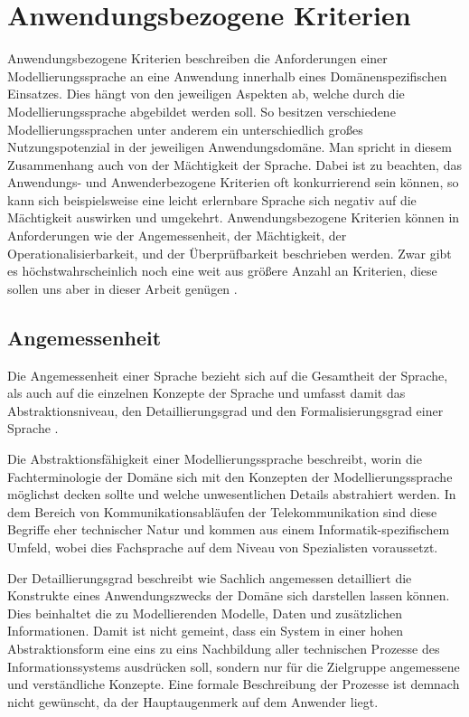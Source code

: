 \section{Anwendungsbezogene Kriterien}
\label{sc:AnwendungsbezogeneKriterien}
Anwendungsbezogene Kriterien beschreiben die Anforderungen einer Modellierungssprache an eine Anwendung innerhalb eines Domänenspezifischen Einsatzes.
Dies hängt von den jeweiligen Aspekten ab, welche durch die Modellierungssprache abgebildet werden soll.
So besitzen verschiedene Modellierungssprachen unter anderem ein unterschiedlich großes Nutzungspotenzial in der jeweiligen Anwendungsdomäne.
Man spricht in diesem Zusammenhang auch von der Mächtigkeit der Sprache.
Dabei ist zu beachten, das Anwendungs- und Anwenderbezogene Kriterien oft konkurrierend sein können,
so kann sich beispielsweise eine leicht erlernbare Sprache sich negativ auf die Mächtigkeit auswirken und umgekehrt.
Anwendungsbezogene Kriterien können in Anforderungen wie der Angemessenheit, der Mächtigkeit, der Operationalisierbarkeit,
und der Überprüfbarkeit beschrieben werden.
Zwar gibt es höchstwahrscheinlich noch eine weit aus größere Anzahl an Kriterien, diese sollen uns aber in dieser Arbeit genügen \cite[95\psq]{JaneFroeming_2009}.
\subsection{Angemessenheit}
\label{ssc:Angemessenheit}
Die Angemessenheit einer Sprache bezieht sich auf die Gesamtheit der Sprache,
als auch auf die einzelnen Konzepte der Sprache und umfasst damit das Abstraktionsniveau, den Detaillierungsgrad und den Formalisierungsgrad einer Sprache \cite[97]{Lobe_2015}.

Die Abstraktionsfähigkeit einer Modellierungssprache beschreibt, worin die Fachterminologie der Domäne sich mit den Konzepten der Modellierungssprache möglichst decken sollte und welche unwesentlichen Details abstrahiert werden. In dem Bereich von Kommunikationsabläufen der Telekommunikation sind diese Begriffe eher technischer Natur und kommen aus einem Informatik-spezifischem Umfeld, wobei dies Fachsprache auf dem Niveau von Spezialisten voraussetzt. 

Der Detaillierungsgrad beschreibt wie Sachlich angemessen detailliert die Konstrukte eines Anwendungszwecks der Domäne sich darstellen lassen können. Dies beinhaltet die zu Modellierenden Modelle, Daten und zusätzlichen Informationen. Damit ist nicht gemeint, dass ein System in einer hohen Abstraktionsform eine eins zu eins Nachbildung aller technischen Prozesse des Informationssystems ausdrücken soll,
sondern nur für die Zielgruppe angemessene und verständliche Konzepte. Eine formale Beschreibung der Prozesse ist demnach nicht gewünscht, da der Hauptaugenmerk auf dem Anwender liegt.

